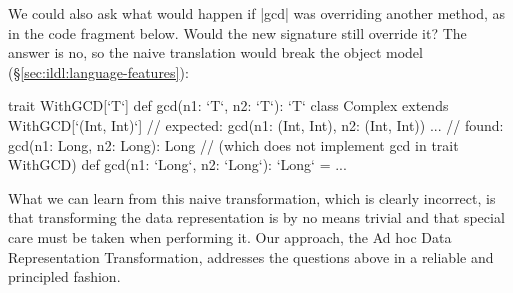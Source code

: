 We could also ask what would happen if |gcd| was overriding another method, as in the code fragment below. Would the new signature still override it? The answer is no, so the naive translation would break the object model (\S\ref{sec:ildl:language-features}):

\begin{lstlisting-nobreak}
trait WithGCD[`T`] {
  def gcd(n1: `T`, n2: `T`): `T`
}
class Complex extends WithGCD[`(Int, Int)`] {
  // expected: gcd(n1: (Int, Int), n2: (Int, Int)) ...
  // found:    gcd(n1: Long, n2: Long): Long
  // (which does not implement gcd in trait WithGCD)
  def gcd(n1: `Long`, n2: `Long`): `Long` = ...
}
\end{lstlisting-nobreak}

What we can learn from this naive transformation, which is clearly incorrect, is that transforming the data representation is by no means trivial and that special care must be taken when performing it. Our approach, the Ad hoc Data Representation Transformation, addresses the questions above in a reliable and principled fashion.


